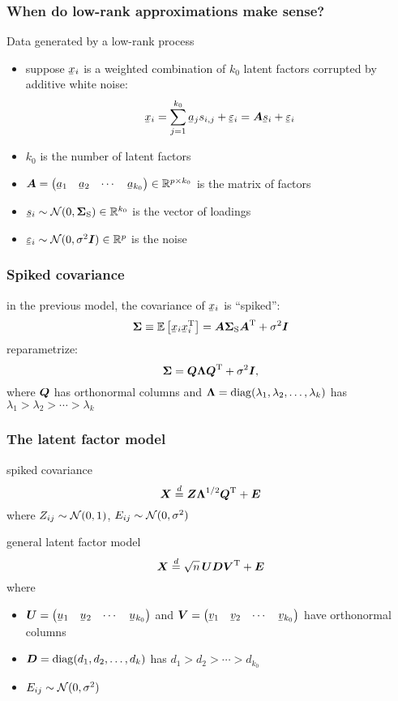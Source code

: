 \documentclass{beamer}
\begin{document}
\begin{frame}
\frametitle{When do low-rank approximations make sense?}
  \begin{block}{Data generated by a low-rank process}
    \begin{itemize}
    \item suppose $\vx_i$ is a weighted combination of $k_0$ latent factors corrupted by additive white noise:
      \[ \vx_i = \sum_{j=1}^{k_0} \va_j s_{i,j} + \vepsilon_i = \mA \vs_i + \vepsilon_i \]
    \item $k_0$ is the number of latent factors
    \item $\mA = \left(\begin{matrix} \va_1 & \va_2 & \cdots & \va_{k_0}\end{matrix}\right) \in \reals^{p \times k_0}$ is the matrix of factors
    \item $\vs_i \sim \Normal(0, \mSigma_\text{S}) \in \reals^{k_0}$ is the vector of loadings 
    \item $\vepsilon_i \sim \Normal(0, \sigma^2 \mI) \in \reals^p$ is the noise
    \end{itemize}
  \end{block}
\end{frame}

\begin{frame}
\frametitle{Spiked covariance}
  in the previous model, the covariance of $\vx_i$ is ``spiked'':
  \[
    \mSigma \equiv \E\left[ \vx_i \vx_i^\trans \right] = \mA \mSigma_\text{S} \mA^\trans + \sigma^2 \mI
  \]
  reparametrize:
  \[
    \boldsymbol{\Sigma} = \boldsymbol{Q} \boldsymbol{\Lambda} \boldsymbol{Q}^{\mathrm{T}} + \sigma^2 \boldsymbol{I},
  \]
  where $\boldsymbol{Q}$ has orthonormal columns and $\boldsymbol{\Lambda} = \operatorname*{diag}( \lambda_1, \lambda_2, \ldots, \lambda_k)$ has $\lambda_1 > \lambda_2 > \cdots > \lambda_k$
\end{frame}

\begin{frame}
\frametitle{The latent factor model}
  \begin{block}{spiked covariance}
  \[
    \boldsymbol{X} \overset{d}{=} \boldsymbol{Z} \boldsymbol{\Lambda}^{1/2} \boldsymbol{Q}^{\mathrm{T}} + \boldsymbol{E}
  \]
  where $Z_{ij} \sim \mathcal{N}(0, 1)$, $E_{ij} \sim \mathcal{N}(0, \sigma^2)$
  \end{block}
  \begin{block}{general latent factor model}
  \[
    \boldsymbol{X} \overset{d}{=} \sqrt{n} \, \boldsymbol{U} \boldsymbol{D} \boldsymbol{V}^{\mathrm{T}} + \boldsymbol{E}
  \]
  where
  \begin{itemize}
  \item $\mU = \left(\begin{matrix} \vu_1 & \vu_2 & \cdots & \vu_{k_0}\end{matrix}\right)$
  and $\mV = \left(\begin{matrix} \vv_1 & \vv_2 & \cdots & \vv_{k_0}\end{matrix}\right)$ have orthonormal columns
  \item $\boldsymbol{D} = \operatorname*{diag}(d_1, d_2, \ldots, d_k)$ has $d_1 > d_2 > \cdots > d_{k_0}$
  \item $E_{ij} \sim \mathcal{N}(0, \sigma^2)$
  \end{itemize}
  \end{block}
\end{frame}
\end{document}
